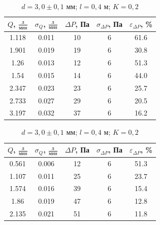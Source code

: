 \documentclass[a4paper,12pt]{article}
\begin{document}
\begin{table}[h!]
\centering
\begin{minipage}{0.48\textwidth}
\centering
    \begin{tabular}{|c|c|c|c|c|}
        \hline
        $Q$, $\frac{\text{л}}{\text{мин}}$ & $\sigma_Q$, $\frac{\text{л}}{\text{мин}}$  & $\Delta P$, Па & $\sigma_{\Delta P}$, Па & $\varepsilon_{\Delta P}$, \% \\
        \hline
        1.118 & 0.011 & 10 & 6 & 61.6 \\ \hline
        1.901 & 0.019 & 19 & 6 & 30.8 \\ \hline
        1.26 & 0.013 & 12 & 6 & 51.3 \\ \hline
        1.54 & 0.015 & 14 & 6 & 44.0 \\ \hline
        2.347 & 0.023 & 23 & 6 & 25.7 \\ \hline
        2.733 & 0.027 & 29 & 6 & 20.5 \\ \hline
        3.197 & 0.032 & 37 & 6 & 16.2 \\ \hline
    \end{tabular}
    \caption{$d = 3,0 \pm 0,1$ мм; $l = 0,2$ м; $K = 0,2$}
\end{minipage}
\hfill
\begin{minipage}{0.48\textwidth}
\centering
    \begin{tabular}{|c|c|c|c|c|}
        \hline
       $Q$, $\frac{\text{л}}{\text{мин}}$ & $\sigma_Q$, $\frac{\text{л}}{\text{мин}}$  & $\Delta P$, Па & $\sigma_{\Delta P}$, Па & $\varepsilon_{\Delta P}$, \% \\
        \hline
        0.561 & 0.006 & 12 & 6 & 51.3 \\ \hline
        1.107 & 0.011 & 25 & 6 & 23.7 \\ \hline
        1.574 & 0.016 & 39 & 6 & 15.4 \\ \hline
        1.86 & 0.019 & 47 & 6 & 12.8 \\ \hline
        2.135 & 0.021 & 51 & 6 & 11.8 \\ \hline
    \end{tabular}
    \caption{$d = 3,0 \pm 0,1$ мм; $l = 0,4$ м; $K = 0,2$}
\end{minipage}
\end{table}
\end{document}

